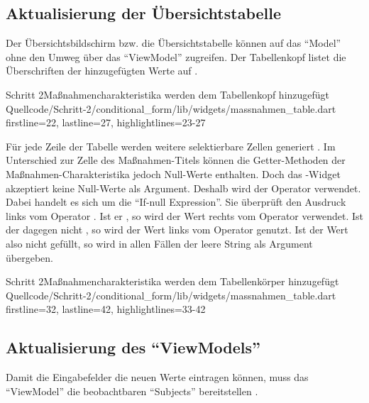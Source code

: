 \subsection{Aktualisierung der Übersichtstabelle}

Der Übersichtsbildschirm bzw. die Übersichtstabelle können auf das \enquote{Model} ohne den Umweg über das \enquote{ViewModel} zugreifen. Der Tabellenkopf listet die Überschriften der hinzugefügten Werte auf .

\begin{alexlisting}{Schritt 2}{Maßnahmencharakteristika werden dem Tabellenkopf hinzugefügt}
  {Quellcode/Schritt-2/conditional_form/lib/widgets/massnahmen_table.dart}
  {firstline=22, lastline=27, highlightlines={23-27}}
  \label{lst:Schritt2MassnahmencharakteristikaEerdenDemTabellenkopfHinzugefuegt}
\end{alexlisting}

Für jede Zeile der Tabelle werden weitere selektierbare Zellen generiert . Im Unterschied zur Zelle des Maßnahmen-Titels können die Getter-Methoden der Maßnahmen-Charakteristika jedoch Null-Werte enthalten.
Doch das -Widget akzeptiert keine Null-Werte als Argument. Deshalb wird der Operator  verwendet. Dabei handelt es sich um die \enquote{If-null Expression}. 
Sie überprüft den Ausdruck links vom Operator . Ist er , so wird der Wert rechts vom Operator verwendet.
Ist der dagegen nicht , so wird der Wert links vom Operator  genutzt.  Ist der Wert also nicht gefüllt, so wird in allen Fällen der leere String  als Argument übergeben.

\begin{alexlisting}{Schritt 2}{Maßnahmencharakteristika werden dem Tabellenkörper hinzugefügt}
  {Quellcode/Schritt-2/conditional_form/lib/widgets/massnahmen_table.dart}
  {firstline=32, lastline=42, highlightlines={33-42}}
  \label{lst:Schritt2MassnahmencharakteristikaWerdenDemTabellenkoerperHinzugefuegt}
\end{alexlisting}

\subsection{Aktualisierung des \enquote{ViewModels}}

Damit die Eingabefelder die neuen Werte eintragen können, muss das \enquote{ViewModel} die beobachtbaren \enquote{Subjects} bereitstellen . 

